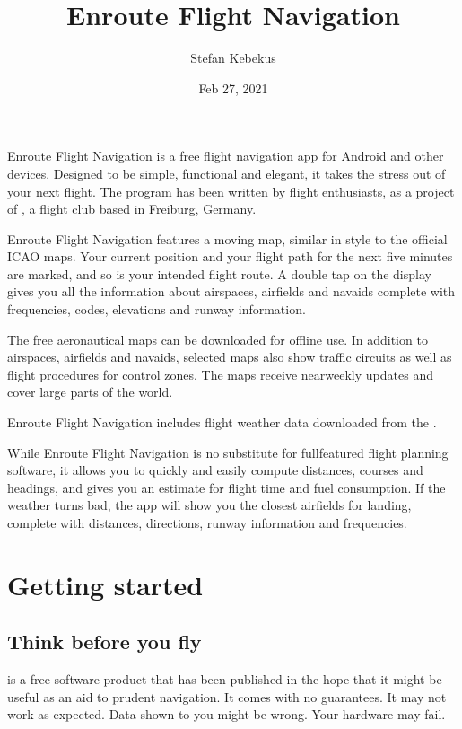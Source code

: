 \documentclass[letterpaper,10pt,english]{sphinxmanual}
\title{Enroute Flight Navigation}
\date{Feb 27, 2021}
\author{Stefan Kebekus}
\let\sphinxpxdimen\pdfpxdimen\else\newdimen\sphinxpxdimen
\begin{document}
\pagestyle{empty}
\sphinxmaketitle
\pagestyle{plain}
\sphinxtableofcontents
\pagestyle{normal}
\label{\detokenize{index::doc}}


\noindent{\hspace*{\fill}\sphinxincludegraphics[width=100\sphinxpxdimen]{{de.akaflieg_freiburg.enroute}.png}\hspace*{\fill}}

\sphinxAtStartPar
Enroute Flight Navigation is a free flight navigation app for Android and other
devices. Designed to be simple, functional and elegant, it takes the stress out
of your next flight. The program has been written by flight enthusiasts, as a
project of , a flight club
based in Freiburg, Germany.

\sphinxAtStartPar
Enroute Flight Navigation features a moving map, similar in style to the
official ICAO maps. Your current position and your flight path for the next five
minutes are marked, and so is your intended flight route. A double tap on the
display gives you all the information about airspaces, airfields and navaids \textendash{}
complete with frequencies, codes, elevations and runway information.

\sphinxAtStartPar
The free aeronautical maps can be downloaded for offline use. In addition to
airspaces, airfields and navaids, selected maps also show traffic circuits as
well as flight procedures for control zones. The maps receive near\sphinxhyphen{}weekly
updates and cover large parts of the world.

\sphinxAtStartPar
Enroute Flight Navigation includes flight weather data downloaded from the
.

\sphinxAtStartPar
While Enroute Flight Navigation is no substitute for full\sphinxhyphen{}featured flight
planning software, it allows you to quickly and easily compute distances,
courses and headings, and gives you an estimate for flight time and fuel
consumption. If the weather turns bad, the app will show you the closest
airfields for landing, complete with distances, directions, runway information
and frequencies.

\part{Getting started}


\chapter{Think before you fly}
\label{\detokenize{01-intro/think:think-before-you-fly}}\label{\detokenize{01-intro/think::doc}}
\sphinxAtStartPar
{} is a free software product that has been published
in the hope that it might be useful as an aid to prudent navigation.  It comes
with no guarantees.  It may not work as expected.  Data shown to you might be
wrong.  Your hardware may fail.
\end{document}

